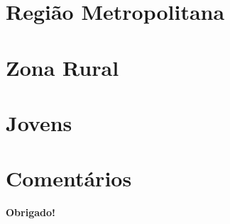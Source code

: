 \documentclass[8pt]{beamer}
\begin{document}
\begin{frame}[label=amzmanauscod2dig]{}
\textit{\hyperlink{indice_principal}{}}

\end{frame}

\begin{frame}[label=amzmanauscnae2dig]{}
\textit{\hyperlink{indice_principal}{}}

\end{frame}

\section{Região Metropolitana}


\begin{frame}[label=amzmetropolitanacod2dig]{}
\textit{\hyperlink{indice_principal}{}}

\end{frame}

\begin{frame}[label=amzmetropolitanacnae2dig]{}
\textit{\hyperlink{indice_principal}{}}

\end{frame}

\section{Zona Rural}


\begin{frame}[label=amzruralcod2dig]{}
\textit{\hyperlink{indice_principal}{}}

\end{frame}

\begin{frame}[label=amzruralcnae2dig]{}
\textit{\hyperlink{indice_principal}{}}

\end{frame}

\section{Jovens}


\begin{frame}[label=amzjovemcod2dig]{}
\textit{\hyperlink{indice_principal}{}}

\end{frame}

\begin{frame}[label=amzjovemcnae2dig]{}
\textit{\hyperlink{indice_principal}{}}

\end{frame}


\section{Comentários}

\frame
{
\begin{center}
	\vfill
	\textbf{Obrigado!}
	\\
	\vfill     
\end{center}
}
\end{document}
